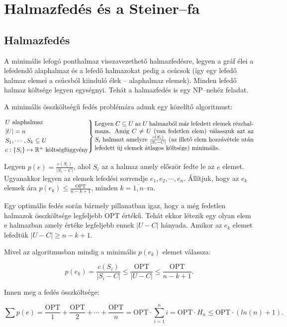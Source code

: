 \skiptooddpage
\section{Halmazfedés és a Steiner--fa}

\subsection{Halmazfedés}
A minimális lefogó ponthalmaz visszavezethető halmazfedésre, legyen a gráf élei
a lefedendő alaphalmaz és a lefedő halmazokat pedig a csúcsok (így egy lefedő
halmaz elemei a csúcsból kiinduló élek -- alaphalmaz elemek). Minden lefedő
halmaz költsége legyen egységnyi. Tehát a halmazfedés is egy NP--nehéz feladat.

A minimális összköltségű fedés problémára adunk egy közelítő algoritmust:

\[
	\begin{rcases}
		U \mbox{ alaphalmaz}         \\
		|U| = n                      \\
		S_1, \cdots, S_k \subseteq U \\
		c : \{ S_i\} \mapsto \mathbb{R}^+ \mbox{ költségfüggvény}\end{rcases}
	\parbox[L]{9cm} { Legyen $C\subseteq U$ az $U$ halmazból már lefedett elemek
		részhalmaza. Amig $C \neq U$ (van fedetlen elem) válasszuk azt az $S_i$ halmazt
		amelyre $\frac{c(S_i)}{|S_i-C|}$ (az illető elem hozzávétele után lefedett új
		elemek átlagos költsége) minimális.
	}
\]

Legyen $p(e)=\frac{c(S_i)}{|S_i-C|}$, ahol $S_i$ az a halmaz amely először fedte
le az $e$ elemet. Ugyanakkor legyen az elemek lefedési sorrendje $e_1, e_2,
	\cdots, e_n$. Állítjuk, hogy az $e_k$ elemek ára
$p(e_k) \leq \frac{\mbox{OPT}}{n-k+1}$, minden $k=\overline{1,n}$--ra.

Egy
optimális fedés során bármely pillanatban igaz, hogy a még fedetlen halmazok
összköltsége legfeljebb OPT értékű. Tehát ekkor létezik egy olyan elem e
halmazban amely értéke legfeljebb ennek $|U-C|$ hányada. Amikor az $e_k$ elemet
lefedtük $|U-C| \geq n-k+1$.

Mivel az algoritmusban mindig a minimális $p(e_k)$ elemet válassza:

\[p(e_k)=\frac{c(S_i)}{|S_i-C|} \leq \frac{\mbox{OPT}}{|U-C|} \leq  \frac{\mbox{OPT}}{n-k+1}.\]

Innen meg a fedés összköltsége:

\[\sum p(e) = \frac{\mbox{OPT}}{1} + \frac{\mbox{OPT}}{2} + \cdots + \frac{\mbox{OPT}}{n}=
	\mbox{OPT} \cdot \sum_{i=1}^n i = \mbox{OPT} \cdot H_n  \leq \mbox{OPT}  \cdot (ln(n)+1). \]

